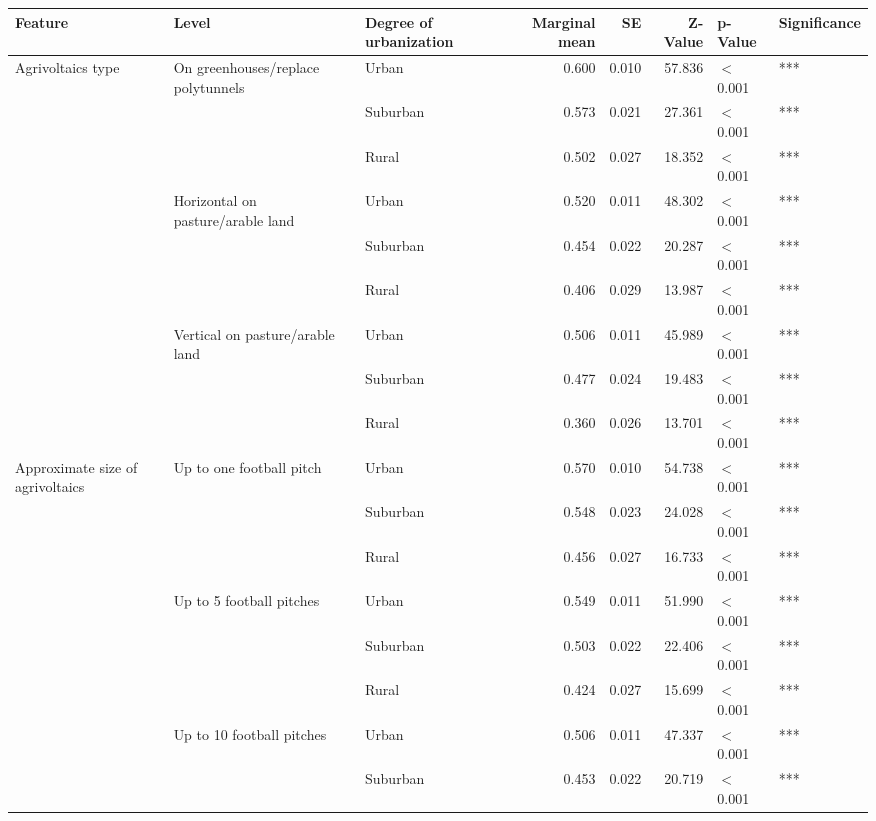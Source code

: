 
\begin{longtable}[t]{>{\raggedright\arraybackslash}p{4cm}>{\raggedright\arraybackslash}p{4cm}>{\raggedright\arraybackslash}p{2.5cm}rrrll}
\toprule
Feature & Level & Degree of urbanization & Marginal mean & SE & Z-Value & p-Value & Significance\\
\midrule
Agrivoltaics type & On greenhouses/replace polytunnels & Urban & 0.600 & 0.010 & 57.836 & $<$0.001 & ***\\
\cmidrule{3-8}\nopagebreak
 &  & Suburban & 0.573 & 0.021 & 27.361 & $<$0.001 & ***\\
\cmidrule{3-8}\nopagebreak
 &  & Rural & 0.502 & 0.027 & 18.352 & $<$0.001 & ***\\
\cmidrule{2-8}\nopagebreak
 & Horizontal on pasture/arable land & Urban & 0.520 & 0.011 & 48.302 & $<$0.001 & ***\\
\cmidrule{3-8}\nopagebreak
 &  & Suburban & 0.454 & 0.022 & 20.287 & $<$0.001 & ***\\
\cmidrule{3-8}\nopagebreak
 &  & Rural & 0.406 & 0.029 & 13.987 & $<$0.001 & ***\\
\cmidrule{2-8}\nopagebreak
 & Vertical on pasture/arable land & Urban & 0.506 & 0.011 & 45.989 & $<$0.001 & ***\\
\cmidrule{3-8}\nopagebreak
 &  & Suburban & 0.477 & 0.024 & 19.483 & $<$0.001 & ***\\
\cmidrule{3-8}\nopagebreak
 &  & Rural & 0.360 & 0.026 & 13.701 & $<$0.001 & ***\\
\cmidrule{1-8}\pagebreak[0]
Approximate size of agrivoltaics & Up to one football pitch & Urban & 0.570 & 0.010 & 54.738 & $<$0.001 & ***\\
\cmidrule{3-8}\nopagebreak
 &  & Suburban & 0.548 & 0.023 & 24.028 & $<$0.001 & ***\\
\cmidrule{3-8}\nopagebreak
 &  & Rural & 0.456 & 0.027 & 16.733 & $<$0.001 & ***\\
\cmidrule{2-8}\nopagebreak
 & Up to 5 football pitches & Urban & 0.549 & 0.011 & 51.990 & $<$0.001 & ***\\
\cmidrule{3-8}\nopagebreak
 &  & Suburban & 0.503 & 0.022 & 22.406 & $<$0.001 & ***\\
\cmidrule{3-8}\nopagebreak
 &  & Rural & 0.424 & 0.027 & 15.699 & $<$0.001 & ***\\
\cmidrule{2-8}\nopagebreak
 & Up to 10 football pitches & Urban & 0.506 & 0.011 & 47.337 & $<$0.001 & ***\\
\cmidrule{3-8}\nopagebreak
 &  & Suburban & 0.453 & 0.022 & 20.719 & $<$0.001 & ***\\

\end{longtable}
